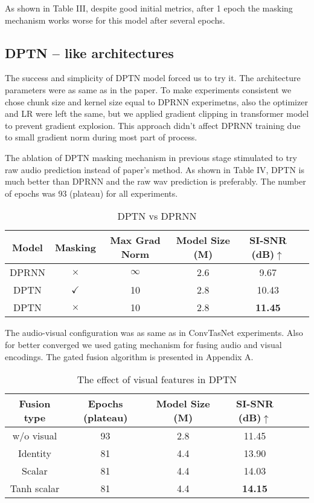 \documentclass[10pt,conference,compsocconf]{IEEEtran}
\begin{document}
 As shown in Table III, despite good initial metrics, after 1 epoch the masking mechanism works worse for this model after several epochs.

\subsection{\textbf{DPTN -- like architectures}}
The success and simplicity of DPTN model forced us to try it. The architecture parameters were as same as in the paper. To make experiments consistent we chose chunk size and kernel size equal to DPRNN experimetns, also the optimizer and LR were left the same, but we applied gradient clipping in transformer model to prevent gradient explosion. This approach didn't affect DPRNN training due to small gradient norm during most part of process.

The ablation of DPTN masking mechanism in previous stage stimulated to try raw audio prediction instead of paper's method.
As shown in Table IV, DPTN is much better than DPRNN and the raw wav prediction is preferably. The number of epochs was 93 (plateau) for all experiments.

\begin{table}[H]
\centering
\caption{DPTN vs DPRNN}
\begin{tabular}{|c|c|c|c|c|c|}
\hline
Model &Masking & Max Grad Norm & Model Size (M) & SI-SNR (dB)$\uparrow$ \\ \hline
 DPRNN & $ \times$ & $\infty$ & 2.6 & 9.67 \\ \hline
 DPTN & $ \checkmark $ & 10 & 2.8 & 10.43 \\ \hline
 DPTN & $ \times $ & 10 & 2.8 & \textbf{11.45} \\ \hline
\end{tabular}
\end{table}

The audio-visual configuration was as same as in ConvTasNet experiments. Also for better converged we used gating mechanism for fusing audio and visual encodings. The gated fusion algorithm is presented in Appendix A.

\begin{table}[H]
\centering
\caption{The effect of visual features in DPTN}
\begin{tabular}{|c|c|c|c|c|c|}
\hline
Fusion type & Epochs (plateau) & Model Size (M) & SI-SNR (dB)$\uparrow$ \\ \hline
 w/o visual & 93 & 2.8 & 11.45 \\ \hline
 Identity & 81 & 4.4 & 13.90 \\ \hline
 Scalar & 81 & 4.4 & 14.03 \\ \hline
 Tanh scalar & 81 & 4.4 & \textbf{14.15} \\ \hline
\end{tabular}
\end{table}
\end{document}
